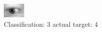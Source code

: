\begin{figure}[h!]
\begin{center}
\includegraphics[width=0.60\columnwidth]{figures/ID706_class_3_target_4.png}
\end{center}
\caption{ Classification: 3 actual target: 4}
\label{fig:ID706_class_3_target_4}
\end{figure}
